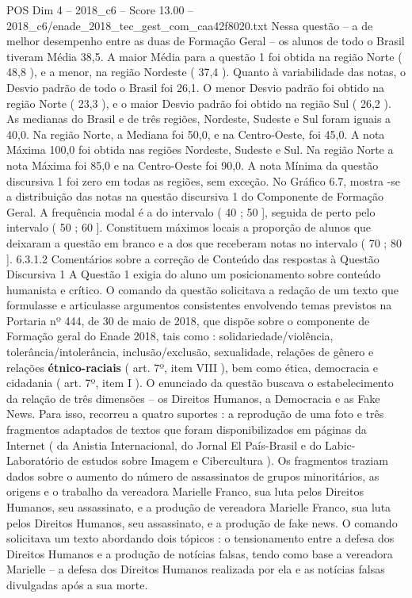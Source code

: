 \begin{textsample}{POS Dim 4 – 2018\_c6 – Score 13.00 – 2018\_c6/enade\_2018\_tec\_gest\_com\_caa42f8020.txt}
Nessa questão – a de melhor desempenho entre as duas de Formação Geral – os alunos de todo o Brasil tiveram Média 38,5.
A maior Média para a questão 1 foi obtida na região Norte ( 48,8 ), e a menor, na região Nordeste ( 37,4 ).
Quanto à variabilidade das notas, o Desvio padrão de todo o Brasil foi 26,1.
O menor Desvio padrão foi obtido na região Norte ( 23,3 ), e o maior Desvio padrão foi obtido na região Sul ( 26,2 ).
As medianas do Brasil e de três regiões, Nordeste, Sudeste e Sul foram iguais a 40,0.
Na região Norte, a Mediana foi 50,0, e na Centro-Oeste, foi 45,0.
A nota Máxima 100,0 foi obtida nas regiões Nordeste, Sudeste e Sul.
Na região Norte a nota Máxima foi 85,0 e na Centro-Oeste foi 90,0.
A nota Mínima da questão discursiva 1 foi zero em todas as regiões, sem exceção.
No Gráfico 6.7, mostra -se a distribuição das notas na questão discursiva 1 do Componente de Formação Geral.
A frequência modal é a do intervalo ( 40 ; 50 ], seguida de perto pelo intervalo ( 50 ; 60 ].
Constituem máximos locais a proporção de alunos que deixaram a questão em branco e a dos que receberam notas no intervalo ( 70 ; 80 ]. 6.3.1.2 Comentários sobre a correção de Conteúdo das respostas à Questão Discursiva 1 A Questão 1 exigia do aluno um posicionamento sobre conteúdo humanista e crítico.
O comando da questão solicitava a redação de um texto que formulasse e articulasse argumentos consistentes envolvendo temas previstos na Portaria nº 444, de 30 de maio de 2018, que dispõe sobre o componente de Formação geral do Enade 2018, tais como : solidariedade/violência, tolerância/intolerância, inclusão/exclusão, sexualidade, relações de gênero e relações \textbf{étnico-raciais} ( art. 7º, item VIII ), bem como ética, democracia e cidadania ( art. 7º, item I ).
O enunciado da questão buscava o estabelecimento da relação de três dimensões – os Direitos Humanos, a Democracia e as Fake News.
Para isso, recorreu a quatro suportes : a reprodução de uma foto e três fragmentos adaptados de textos que foram disponibilizados em páginas da Internet ( da Anistia Internacional, do Jornal El País-Brasil e do Labic-Laboratório de estudos sobre Imagem e Cibercultura ).
Os fragmentos traziam dados sobre o aumento do número de assassinatos de grupos minoritários, as origens e o trabalho da vereadora Marielle Franco, sua luta pelos Direitos Humanos, seu assassinato, e a produção de vereadora Marielle Franco, sua luta pelos Direitos Humanos, seu assassinato, e a produção de fake news.
O comando solicitava um texto abordando dois tópicos : o tensionamento entre a defesa dos Direitos Humanos e a produção de notícias falsas, tendo como base a vereadora Marielle – a defesa dos Direitos Humanos realizada por ela e as notícias falsas divulgadas após a sua morte.

\end{textsample}
